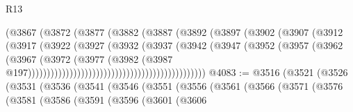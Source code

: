 \begin{lexlean}{R13}
\begin{coremodule}
                                                (@3867
                                                  (@3872
                                                    (@3877
                                                      (@3882
                                                        (@3887
                                                          (@3892
                                                            (@3897
                                                              (@3902
                                                                (@3907
                                                                  (@3912
                                                                    (@3917
                                                                      (@3922
                                                                        (@3927
                                                                          (@3932
                                                                            (@3937
                                                                              (@3942
                                                                                (@3947
                                                                                  (@3952
                                                                                    (@3957
                                                                                      (@3962
                                                                                        (@3967
                                                                                          (@3972
                                                                                            (@3977
                                                                                              (@3982
                                                                                                (@3987
                                                                                                  @197)))))))))))))))))))))))))))))))))))))))))))))))
@4083 := @3516
    (@3521
      (@3526
        (@3531
          (@3536
            (@3541
              (@3546
                (@3551
                  (@3556
                    (@3561
                      (@3566
                        (@3571
                          (@3576
                            (@3581
                              (@3586
                                (@3591
                                  (@3596
                                    (@3601
                                      (@3606

\end{coremodule}
\end{lexlean}
